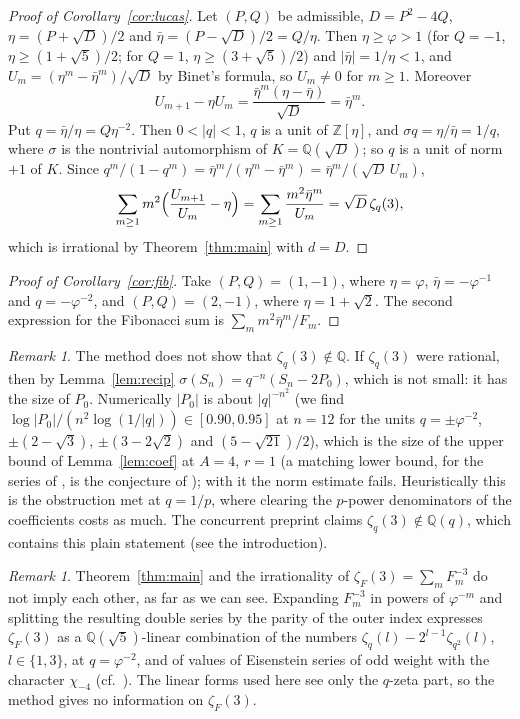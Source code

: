 \documentclass[11pt]{amsart}
\theoremstyle{definition}
\theoremstyle{remark}
\newtheorem{remark}[theorem]{Remark}
\numberwithin{equation}{section}
\newcommand{\ZZ}{\mathbb{Z}}
\newcommand{\QQ}{\mathbb{Q}}
\begin{document}
\begin{proof}[Proof of Corollary~\ref{cor:lucas}]
Let $(P,Q)$ be admissible, $D=P^2-4Q$, $\eta=(P+\sqrt D)/2$ and $\bar\eta=(P-\sqrt D)/2=Q/\eta$. Then $\eta\ge\varphi>1$
(for $Q=-1$, $\eta\ge(1+\sqrt5)/2$; for $Q=1$, $\eta\ge(3+\sqrt5)/2$) and $|\bar\eta|=1/\eta<1$, and $U_m=(\eta^m-\bar\eta^m)/\sqrt D$ by Binet's formula, so
$U_m\ne0$ for $m\ge1$. Moreover
\[
U_{m+1}-\eta U_m=\frac{\bar\eta^m(\eta-\bar\eta)}{\sqrt D}=\bar\eta^m.
\]
Put $q=\bar\eta/\eta=Q\eta^{-2}$. Then $0<|q|<1$, $q$ is a unit of $\ZZ[\eta]$, and $\sigma q=\eta/\bar\eta=1/q$, where
$\sigma$ is the nontrivial automorphism of $K=\QQ(\sqrt D)$; so $q$ is a unit of norm $+1$ of $K$. Since
$q^m/(1-q^m)=\bar\eta^m/(\eta^m-\bar\eta^m)=\bar\eta^m/(\sqrt D\,U_m)$,
\[
\sum_{m\ge1}m^2\Bigl(\frac{U_{m+1}}{U_m}-\eta\Bigr)=\sum_{m\ge1}\frac{m^2\bar\eta^m}{U_m}=\sqrt D\,\zeta_q(3),
\]
which is irrational by Theorem~\ref{thm:main} with $d=D$.
\end{proof}

\begin{proof}[Proof of Corollary~\ref{cor:fib}]
Take $(P,Q)=(1,-1)$, where $\eta=\varphi$, $\bar\eta=-\varphi^{-1}$ and $q=-\varphi^{-2}$, and $(P,Q)=(2,-1)$, where
$\eta=1+\sqrt2$. The second expression for the Fibonacci sum is $\sum_mm^2\bar\eta^m/F_m$.
\end{proof}

\begin{remark}\label{rem:plain}
The method does not show that $\zeta_q(3)\notin\QQ$. If $\zeta_q(3)$ were rational, then by Lemma~\ref{lem:recip}
$\sigma(S_n)=q^{-n}(S_n-2P_0)$, which is not small: it has the size of $P_0$. Numerically $|P_0|$ is about
$|q|^{-n^2}$ (we find $\log|P_0|/(n^2\log(1/|q|))\in[0.90,0.95]$ at $n=12$ for the units $q=\pm\varphi^{-2}$, $\pm(2-\sqrt3)$, $\pm(3-2\sqrt2)$ and $(5-\sqrt{21})/2$), which is the size of
the upper bound of Lemma~\ref{lem:coef} at $A=4$, $r=1$ (a matching lower bound, for the series of \cite{KRZ06}, is the
conjecture of \cite[\S3.5]{KRZ06}); with it the norm estimate fails. Heuristically this is the obstruction met at $q=1/p$, where
clearing the $p$-power denominators of the coefficients costs as much.
The concurrent preprint \cite{Twi26} claims $\zeta_q(3)\notin\QQ(q)$, which contains this plain statement
(see the introduction).
\end{remark}

\begin{remark}\label{rem:fibzeta}
Theorem~\ref{thm:main} and the irrationality of $\zeta_F(3)=\sum_mF_m^{-3}$ \cite{Kri26a} do not imply each other, as far
as we can see. Expanding $F_m^{-3}$ in powers of $\varphi^{-m}$ and splitting the resulting double series by the parity
of the outer index expresses $\zeta_F(3)$ as a $\QQ(\sqrt5)$-linear combination of the numbers
$\zeta_q(l)-2^{l-1}\zeta_{q^2}(l)$, $l\in\{1,3\}$, at $q=\varphi^{-2}$, and of values of Eisenstein series of odd weight
with the character $\chi_{-4}$ (cf.\ \cite[\S1]{Kri26a}). The linear forms used here see only the $q$-zeta part, so the
method gives no information on $\zeta_F(3)$.
\end{remark}
\end{document}
